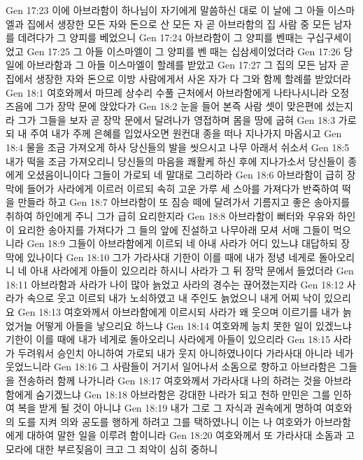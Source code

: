 Gen 17:23  이에 아브라함이 하나님이 자기에게 말씀하신 대로 이 날에 그 아들 이스마엘과 집에서 생장한 모든 자와 돈으로 산 모든 자 곧 아브라함의 집 사람 중 모든 남자를 데려다가 그 양피를 베었으니
Gen 17:24  아브라함이 그 양피를 벤때는 구십구세이었고
Gen 17:25  그 아들 이스마엘이 그 양피를 벤 때는 십삼세이었더라
Gen 17:26  당일에 아브라함과 그 아들 이스마엘이 할례를 받았고
Gen 17:27  그 집의 모든 남자 곧 집에서 생장한 자와 돈으로 이방 사람에게서 사온 자가 다 그와 함께 할례를 받았더라
Gen 18:1  여호와께서 마므레 상수리 수풀 근처에서 아브라함에게 나타나시니라 오정 즈음에 그가 장막 문에 앉았다가
Gen 18:2  눈을 들어 본즉 사람 셋이 맞은편에 섰는지라 그가 그들을 보자 곧 장막 문에서 달려나가 영접하며 몸을 땅에 굽혀
Gen 18:3  가로되 내 주여 내가 주께 은혜를 입었사오면 원컨대 종을 떠나 지나가지 마옵시고
Gen 18:4  물을 조금 가져오게 하사 당신들의 발을 씻으시고 나무 아래서 쉬소서
Gen 18:5  내가 떡을 조금 가져오리니 당신들의 마음을 쾌활케 하신 후에 지나가소서 당신들이 종에게 오셨음이니이다 그들이 가로되 네 말대로 그리하라
Gen 18:6  아브라함이 급히 장막에 들어가 사라에게 이르러 이르되 속히 고운 가루 세 스아를 가져다가 반죽하여 떡을 만들라 하고
Gen 18:7  아브라함이 또 짐승 떼에 달려가서 기름지고 좋은 송아지를 취하여 하인에게 주니 그가 급히 요리한지라
Gen 18:8  아브라함이 뻐터와 우유와 하인이 요리한 송아지를 가져다가 그 들의 앞에 진설하고 나무아래 모셔 서매 그들이 먹으니라
Gen 18:9  그들이 아브라함에게 이르되 네 아내 사라가 어디 있느냐 대답하되 장막에 있나이다
Gen 18:10  그가 가라사대 기한이 이를 때에 내가 정녕 네게로 돌아오리니 네 아내 사라에게 아들이 있으리라 하시니 사라가 그 뒤 장막 문에서 들었더라
Gen 18:11  아브라함과 사라가 나이 많아 늙었고 사라의 경수는 끊어졌는지라
Gen 18:12  사라가 속으로 웃고 이르되 내가 노쇠하였고 내 주인도 늙었으니 내게 어찌 낙이 있으리요
Gen 18:13  여호와께서 아브라함에게 이르시되 사라가 왜 웃으며 이르기를 내가 늙었거늘 어떻게 아들을 낳으리요 하느냐
Gen 18:14  여호와께 능치 못한 일이 있겠느냐 기한이 이를 때에 내가 네게로 돌아오리니 사라에게 아들이 있으리라
Gen 18:15  사라가 두려워서 승인치 아니하여 가로되 내가 웃지 아니하였나이다 가라사대 아니라 네가 웃었느니라
Gen 18:16  그 사람들이 거기서 일어나서 소돔으로 향하고 아브라함은 그들을 전송하러 함께 나가니라
Gen 18:17  여호와께서 가라사대 나의 하려는 것을 아브라함에게 숨기겠느냐
Gen 18:18  아브라함은 강대한 나라가 되고 천하 만민은 그를 인하여 복을 받게 될 것이 아니냐
Gen 18:19  내가 그로 그 자식과 권속에게 명하여 여호와의 도를 지켜 의와 공도를 행하게 하려고 그를 택하였나니 이는 나 여호와가 아브라함에게 대하여 말한 일을 이루려 함이니라
Gen 18:20  여호와께서 또 가라사대 소돔과 고모라에 대한 부르짖음이 크고 그 죄악이 심히 중하니
